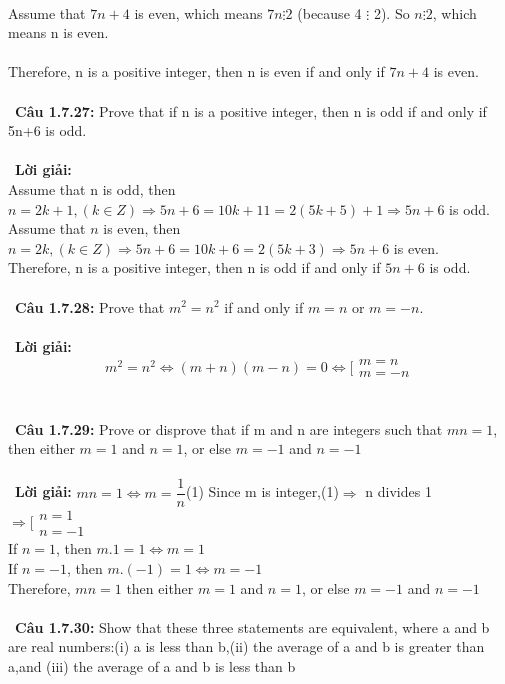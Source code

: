 \documentclass[a4paper]{article}
\begin{document}
\\ Assume that $7n+4$ is even, which means $7n \vdots 2$ (because 4 $\vdots$ 2). So $n \vdots 2$, which means n is even.
\\\\ Therefore, n is a positive integer, then n is even if and only if $7n+4$ is even.  \\\ \\\
\textbf{Câu 1.7.27: } Prove that if n is a positive integer, then n is odd if and only if 5n+6 is odd.
 \\\ \\\
\textbf{Lời giải: } \\ Assume that n is odd, then $n=2k+1, (k \in Z) \Rightarrow 5n+6=10k+11=2(5k+5)+1 \Rightarrow 5n+6$ is odd.
\\ Assume that $n$ is even, then $n=2k, (k \in Z) \Rightarrow 5n+6=10k+6=2(5k+3) \Rightarrow 5n+6$ is even.
\\Therefore, n is a positive integer, then n is odd if and only if $5n+6$ is odd.   \\\ \\\
\textbf{Câu 1.7.28: } Prove that $m^{2}=n^{2}$ if and only if $m=n$ or $m=-n$.
 \\\ \\\
\textbf{Lời giải: } $$m^{2}=n^{2} \Leftrightarrow (m+n)(m-n)=0 \Leftrightarrow [\begin{array}{l} m=n \\ m=-n \end{array} $$ \\\ \\\
\textbf{Câu 1.7.29: } Prove or disprove that if m and n are integers such that $mn=1$, then either $m=1$ and $n=1$, or else $m=-1$ and $n=-1$
 \\\ \\\
\textbf{Lời giải: } $mn=1 \Leftrightarrow m=\dfrac{1}{n}$(1)
Since m is integer,(1)$\Rightarrow$ n divides 1 $\Rightarrow[\begin{array}{l} n=1 \\ n=-1 \end{array}$
\\If $n=1$, then $m.1=1 \Leftrightarrow m=1$
\\If $n=-1$, then $m.(-1)=1 \Leftrightarrow m=-1$
\\Therefore, $mn=1$ then either $m=1$ and $n=1$, or else $m=-1$ and $n=-1$ \\\ \\\
\textbf{Câu 1.7.30: } Show that these three statements are equivalent, where a and b are real numbers:(i) a is less than b,(ii) the average of a and b is greater than a,and (iii) the average of a and b is less than b \\\ \\\
\end{document}
